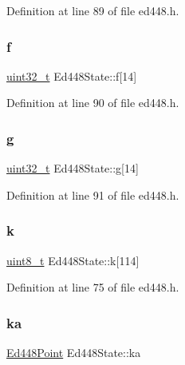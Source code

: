 Definition at line 89 of file ed448.\+h.

\mbox{\label{structEd448State_a6bc488bc58706d2eac01880e5df4c54b}} 
\subsubsection{\texorpdfstring{f}{f}}
{\footnotesize\ttfamily \hyperlink{stdint_8h_a435d1572bf3f880d55459d9805097f62}{uint32\+\_\+t} Ed448\+State\+::f\mbox{[}14\mbox{]}}



Definition at line 90 of file ed448.\+h.

\mbox{\label{structEd448State_adea8c65b2e29b9bbf50d317dfd064433}} 
\subsubsection{\texorpdfstring{g}{g}}
{\footnotesize\ttfamily \hyperlink{stdint_8h_a435d1572bf3f880d55459d9805097f62}{uint32\+\_\+t} Ed448\+State\+::g\mbox{[}14\mbox{]}}



Definition at line 91 of file ed448.\+h.

\mbox{\label{structEd448State_adecc7312993a236e3df0d92af8bb2207}} 
\subsubsection{\texorpdfstring{k}{k}}
{\footnotesize\ttfamily \hyperlink{stdint_8h_aba7bc1797add20fe3efdf37ced1182c5}{uint8\+\_\+t} Ed448\+State\+::k\mbox{[}114\mbox{]}}



Definition at line 75 of file ed448.\+h.

\mbox{\label{structEd448State_a3f57a359818f62157012833c5126f8cf}} 
\subsubsection{\texorpdfstring{ka}{ka}}
{\footnotesize\ttfamily \hyperlink{structEd448Point}{Ed448\+Point} Ed448\+State\+::ka}




